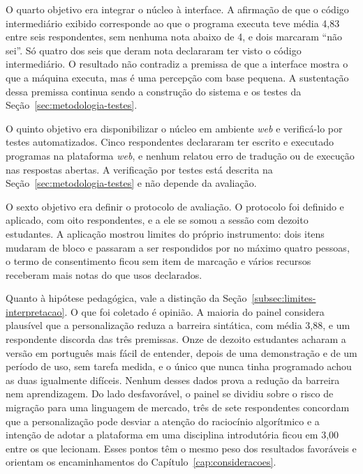 O quarto objetivo era integrar o núcleo à interface. A afirmação de que o código intermediário exibido corresponde ao que o programa executa teve média 4,83 entre seis respondentes, sem nenhuma nota abaixo de 4, e dois marcaram ``não sei''. Só quatro dos seis que deram nota declararam ter visto o código intermediário. O resultado não contradiz a premissa de que a interface mostra o que a máquina executa, mas é uma percepção com base pequena. A sustentação dessa premissa continua sendo a construção do sistema e os testes da Seção~\ref{sec:metodologia-testes}.

O quinto objetivo era disponibilizar o núcleo em ambiente \textit{web} e verificá-lo por testes automatizados. Cinco respondentes declararam ter escrito e executado programas na plataforma \textit{web}, e nenhum relatou erro de tradução ou de execução nas respostas abertas. A verificação por testes está descrita na Seção~\ref{sec:metodologia-testes} e não depende da avaliação.

O sexto objetivo era definir o protocolo de avaliação. O protocolo foi definido e aplicado, com oito respondentes, e a ele se somou a sessão com dezoito estudantes. A aplicação mostrou limites do próprio instrumento: dois itens mudaram de bloco e passaram a ser respondidos por no máximo quatro pessoas, o termo de consentimento ficou sem item de marcação e vários recursos receberam mais notas do que usos declarados.

Quanto à hipótese pedagógica, vale a distinção da Seção~\ref{subsec:limites-interpretacao}. O que foi coletado é opinião. A maioria do painel considera plausível que a personalização reduza a barreira sintática, com média 3,88, e um respondente discorda das três premissas. Onze de dezoito estudantes acharam a versão em português mais fácil de entender, depois de uma demonstração e de um período de uso, sem tarefa medida, e o único que nunca tinha programado achou as duas igualmente difíceis. Nenhum desses dados prova a redução da barreira nem aprendizagem. Do lado desfavorável, o painel se dividiu sobre o risco de migração para uma linguagem de mercado, três de sete respondentes concordam que a personalização pode desviar a atenção do raciocínio algorítmico e a intenção de adotar a plataforma em uma disciplina introdutória ficou em 3,00 entre os que lecionam. Esses pontos têm o mesmo peso dos resultados favoráveis e orientam os encaminhamentos do Capítulo~\ref{cap:consideracoes}.
